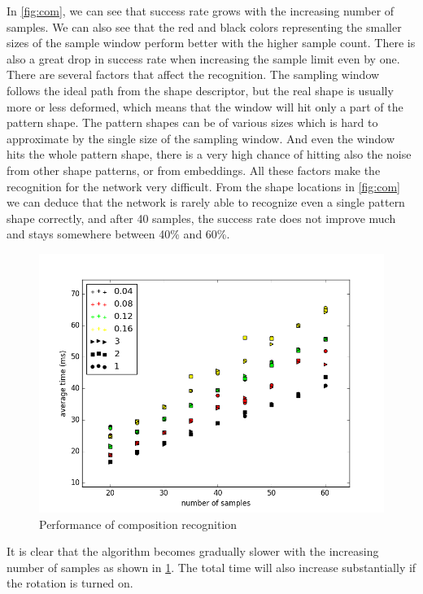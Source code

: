 In \cref{fig:com}, we can see that success rate grows with the increasing number of samples. We can also see that the red and black colors representing the smaller sizes of the sample window perform better with the higher sample count. There is also a great drop in success rate when increasing the sample limit even by one. There are several factors that affect the recognition. The sampling window follows the ideal path from the shape descriptor, but the real shape is usually more or less deformed, which means that the window will hit only a part of the pattern shape. The pattern shapes can be of various sizes which is hard to approximate by the single size of the sampling window. And even the window hits the whole pattern shape, there is a very high chance of hitting also the noise from other shape patterns, or from embeddings. All these factors make the recognition for the network very difficult. From the shape locations in \cref{fig:com} we can deduce that the network is rarely able to recognize even a single pattern shape correctly, and after 40 samples, the success rate does not improve much and stays somewhere between 40\% and 60\%.

\begin{figure}[!htb]
\centering
\includegraphics[width=.8\linewidth]{ext/figure_composition_speed.png}
\caption{Performance of composition recognition}
\label{fig:com_speed}
\end{figure}

It is clear that the algorithm becomes gradually slower with the increasing number of samples as shown in \cref{fig:com_speed}. The total time will also increase substantially if the rotation is turned on.

